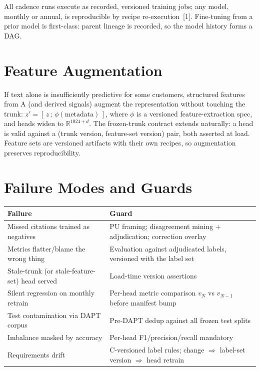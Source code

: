 \documentclass[conference]{IEEEtran}
\begin{document}
All cadence runs execute as recorded, versioned training jobs; any model, monthly or annual, is reproducible by recipe re-execution~[1]. Fine-tuning from a prior model is first-class: parent lineage is recorded, so the model history forms a DAG.

\section{Feature Augmentation}
\label{sec:aug}
If text alone is insufficiently predictive for some customers, structured features from A (and derived signals) augment the representation without touching the trunk: $z' = [\,z \,;\, \phi(\text{metadata})\,]$, where $\phi$ is a versioned feature-extraction spec, and heads widen to $\mathbb{R}^{1024+d}$. The frozen-trunk contract extends naturally: a head is valid against a (trunk version, feature-set version) pair, both asserted at load. Feature sets are versioned artifacts with their own recipes, so augmentation preserves reproducibility.

\section{Failure Modes and Guards}
\begin{table}[h]
\scriptsize
\centering
\begin{tabular}{p{3.6cm} p{3.9cm}}
\toprule
\textbf{Failure} & \textbf{Guard} \\
\midrule
Missed citations trained as negatives & PU framing; disagreement mining + adjudication; correction overlay \\
Metrics flatter/blame the wrong thing & Evaluation against adjudicated labels, versioned with the label set \\
Stale-trunk (or stale-feature-set) head served & Load-time version assertions \\
Silent regression on monthly retrain & Per-head metric comparison $v_N$ vs $v_{N-1}$ before manifest bump \\
Test contamination via DAPT corpus & Pre-DAPT dedup against all frozen test splits \\
Imbalance masked by accuracy & Per-head F1/precision/recall mandatory \\
Requirements drift & C-versioned label rules; change $\Rightarrow$ label-set version $\Rightarrow$ head retrain \\
\bottomrule
\end{tabular}
\end{table}
\end{document}
